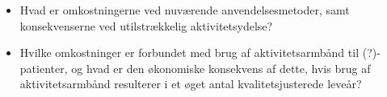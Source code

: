 

\noindent  
\begin{itemize}
\item Hvad er omkostningerne ved nuværende anvendelsesmetoder, samt konsekvenserne ved utilstrækkelig aktivitetsydelse? 

\item Hvilke omkostninger er forbundet med brug af aktivitetsarmbånd til (?)-patienter, og hvad er den økonomiske konsekvens af dette, hvis brug af aktivitetsarmbånd resulterer i et øget antal kvalitetsjusterede leveår?





\end{itemize}
 



